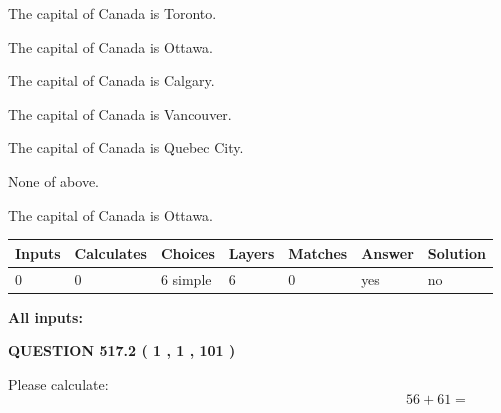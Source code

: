 \documentclass[12pt]{article}
\begin{document}
 
The capital of Canada is Toronto.
 
 
The capital of Canada is Ottawa.
 
 
The capital of Canada is Calgary.
 
 
The capital of Canada is Vancouver.
 
 
The capital of Canada is Quebec City.
 
 
 None of above.
 
 
\noindent{}
 
 
The capital of Canada is Ottawa.
 
 
\noindent{}
 
 
   
   
   
   
\noindent\begin{tabular}{|l|l|l|l|l|l|l|}
 \hline
Inputs & Calculates & Choices & Layers & Matches & Answer & Solution \\ \hline
 0  & 
 0  & 
 6
  simple  
  & 
 6  & 
 0  & 
  yes & 
  no 
  \\ \hline
 \end{tabular}
   
   
   
   
\noindent{}
   
   
   
   
\noindent\vspace{0.1in}\hspace{-0.08in} {\textbf{\Large{All inputs: }}}
   
   
  
\vspace{0.2in}
  
{\textbf{\Large{QUESTION
517.2 
 ( 1 , 1 , 101 )
}}}
  
  
 
Please calculate:
\begin{equation}
56 +  %
61 = \nonumber
\end{equation}
 
 
 
\noindent{}
 
\end{document}
